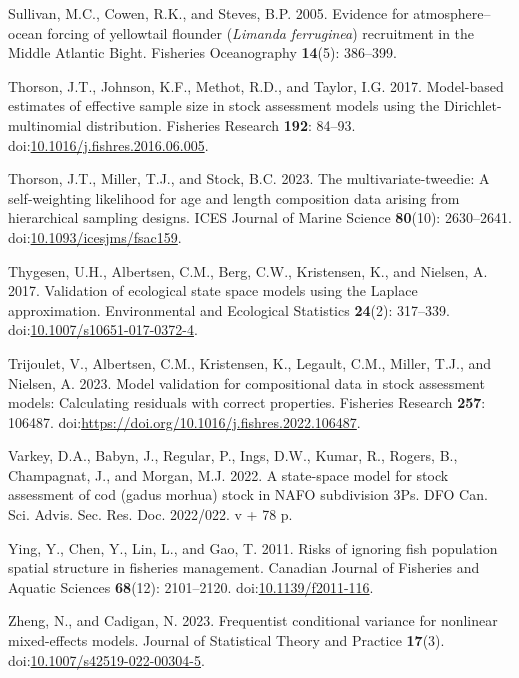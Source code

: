\documentclass[
]{article}
\newlength{\cslhangindent}
\newlength{\cslentryspacingunit} %
\newenvironment{CSLReferences}[2] %
 {%
  \setlength{\parindent}{0pt}
  \ifodd #1
  \let\oldpar\par
  \def\par{\hangindent=\cslhangindent\oldpar}
  \fi
  \setlength{\parskip}{#2\cslentryspacingunit}
 }%
 {}
\begin{document}
\begin{CSLReferences}{1}{0}
\leavevmode{}%
Sullivan, M.C., Cowen, R.K., and Steves, B.P. 2005. Evidence for
atmosphere{--}ocean forcing of yellowtail flounder (\emph{{L}imanda}
\emph{ferruginea}) recruitment in the {M}iddle {A}tlantic {B}ight.
Fisheries Oceanography \textbf{14}(5): 386--399.

\leavevmode{}%
Thorson, J.T., Johnson, K.F., Methot, R.D., and Taylor, I.G. 2017.
Model-based estimates of effective sample size in stock assessment
models using the {D}irichlet-multinomial distribution. Fisheries
Research \textbf{192}: 84--93.
doi:\href{https://doi.org/10.1016/j.fishres.2016.06.005}{10.1016/j.fishres.2016.06.005}.

\leavevmode{}%
Thorson, J.T., Miller, T.J., and Stock, B.C. 2023. The
multivariate-tweedie: A self-weighting likelihood for age and length
composition data arising from hierarchical sampling designs. ICES
Journal of Marine Science \textbf{80}(10): 2630--2641.
doi:\href{https://doi.org/10.1093/icesjms/fsac159}{10.1093/icesjms/fsac159}.

\leavevmode{}%
Thygesen, U.H., Albertsen, C.M., Berg, C.W., Kristensen, K., and
Nielsen, A. 2017. {Validation of ecological state space models using the
Laplace approximation}. Environmental and Ecological Statistics
\textbf{24}(2): 317--339.
doi:\href{https://doi.org/10.1007/s10651-017-0372-4}{10.1007/s10651-017-0372-4}.

\leavevmode{}%
Trijoulet, V., Albertsen, C.M., Kristensen, K., Legault, C.M., Miller,
T.J., and Nielsen, A. 2023. Model validation for compositional data in
stock assessment models: Calculating residuals with correct properties.
Fisheries Research \textbf{257}: 106487.
doi:\url{https://doi.org/10.1016/j.fishres.2022.106487}.

\leavevmode{}%
Varkey, D.A., Babyn, J., Regular, P., Ings, D.W., Kumar, R., Rogers, B.,
Champagnat, J., and Morgan, M.J. 2022. A state-space model for stock
assessment of cod (gadus morhua) stock in NAFO subdivision 3Ps. {DFO}
{Can.} {Sci.} {Advis.} {Sec.} {Res.} {Doc.} 2022/022. v + 78 p.

\leavevmode{}%
Ying, Y., Chen, Y., Lin, L., and Gao, T. 2011. Risks of ignoring fish
population spatial structure in fisheries management. Canadian Journal
of Fisheries and Aquatic Sciences \textbf{68}(12): 2101--2120.
doi:\href{https://doi.org/10.1139/f2011-116}{10.1139/f2011-116}.

\leavevmode{}%
Zheng, N., and Cadigan, N. 2023. Frequentist conditional variance for
nonlinear mixed-effects models. Journal of Statistical Theory and
Practice \textbf{17}(3).
doi:\href{https://doi.org/10.1007/s42519-022-00304-5}{10.1007/s42519-022-00304-5}.

\end{CSLReferences}
\end{document}
